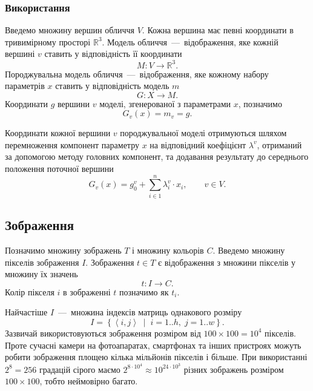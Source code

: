 \subsubsection{Використання}

Введемо множину вершин обличчя $V$.
Кожна вершина має певні координати в тривимірному просторі $\mathbb{R}^3$.
Модель обличчя~---~відображення,
яке кожній вершині $v$ ставить у відповідність її координати
\begin{equation*}
  M: V \rightarrow \mathbb{R}^3.
\end{equation*}
Породжувальна модель обличчя~---~відображення,
яке кожному набору параметрів $x$ ставить у відповідність модель $m$
\begin{equation*}
  G: X \rightarrow M.
\end{equation*}
Координати $g$ вершини $v$ моделі, згенерованої з параметрами $x$, позначимо
\begin{equation*}
  G_v\left( x \right) = m_v = g.
\end{equation*}

Координати кожної вершини $v$ породжувальної моделі отримуються шляхом
перемноження компонент параметру $x$ на відповідний коефіцієнт $\lambda^v$,
отриманий за допомогою методу головних компонент,
та додавання результату до середнього положення поточної вершини
\begin{equation*}
  G_v\left( x \right) = g_0^v + \sum_{i \in 1}^n \lambda_i^v \cdot x_i,
  \qquad v \in V.
\end{equation*}

\subsection{Зображення}

Позначимо множину зображень $T$ і множину кольорів $C$.
Введемо множину пікселів зображення $I$.
Зображення $t \in T$ є відображення з множини пікселів у множину їх значень
\begin{equation*}
  t: I \rightarrow C.
\end{equation*}
Колір пікселя $i$ в зображенні $t$ позначимо як $t_i$.

Найчастіше $I$~---~множина індексів матриць однакового розміру
\begin{equation*}
  I = \left\{ \left\langle i, j \right\rangle
    \;\middle|\; i = 1..h,\; j = 1..w \right\}.
\end{equation*}
Зазвичай використовуються зображення розміром від
$100 \times 100 = 10^4$ пікселів.
Проте сучасні камери на фотоапаратах, смартфонах та інших пристроях
можуть робити зображення площею кілька мільйонів пікселів і більше.
При використанні $2^8 = 256$ градацій сірого маємо
$2^{8 \cdot 10^4} \approx 10^{24 \cdot 10^3}$
різних зображень розміром $100 \times 100$, тобто неймовірно багато.


